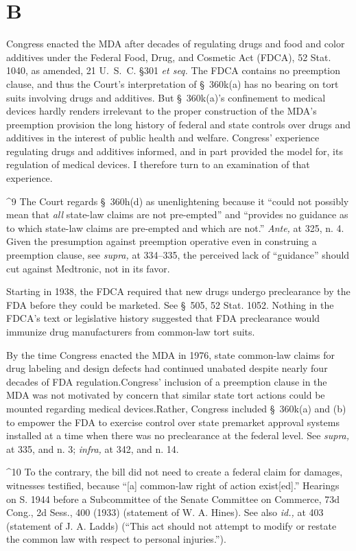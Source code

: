 {{{\section{B}

  Congress enacted the MDA after decades of regulating drugs and
food and color additives under the Federal Food, Drug, and Cosmetic
Act (FDCA), 52 Stat. 1040, as amended, 21 U.~S.~C. \S301 \emph{et
seq.} The FDCA contains no preemption clause, and thus the Court's
interpretation of \S~360k(a) has no bearing on tort suits involving
drugs and additives. But \S~360k(a)'s confinement to medical devices
hardly renders irrelevant to the proper construction of the MDA's
preemption provision the long history of federal and state controls
over drugs and additives in the interest of public health and welfare.
Congress' experience regulating drugs and additives informed, and
in part provided the model for, its regulation of medical devices. I
therefore turn to an examination of that experience. \newpage 

^9 The Court regards \S~360h(d) as unenlightening because it ``could
not possibly mean that \emph{all} state-law claims are not pre-empted''
and ``provides no guidance as to which state-law claims are pre-empted
and which are not.'' \emph{Ante,} at 325, n. 4. Given the presumption
against preemption operative even in construing a preemption clause,
see \emph{supra,} at 334--335, the perceived lack of ``guidance''
should cut against Medtronic, not in its favor.

  Starting in 1938, the FDCA required that new drugs undergo
preclearance by the FDA before they could be marketed. See \S~505,
52 Stat. 1052. Nothing in the FDCA's text or legislative history
suggested that FDA preclearance would immunize drug manufacturers from
common-law tort suits.\footnotemark[10]

  By the time Congress enacted the MDA in 1976, state common-law claims
for drug labeling and design defects had continued unabated despite
nearly four decades of FDA regulation.\footnotemark[11] Congress' inclusion of a
preemption clause in the MDA was not motivated by concern that similar
state tort actions could be mounted regarding medical devices.\footnotemark[12]
\newpage  Rather, Congress included \S~360k(a) and (b) to empower the
FDA to exercise control over state premarket approval systems installed
at a time when there was no preclearance at the federal level. See
\emph{supra,} at 335, and n. 3; \emph{infra,} at 342, and n. 14.

^10 To the contrary, the bill did not need to create a federal claim for
damages, witnesses testified, because ``[a] common-law right of action
exist[ed].'' Hearings on S. 1944 before a Subcommittee of the Senate
Committee on Commerce, 73d Cong., 2d Sess., 400 (1933) (statement of W.
A. Hines). See also \emph{id.,} at 403 (statement of J. A. Ladds) (``This
act should not attempt to modify or restate the common law with respect
to personal injuries.'').

}}}

